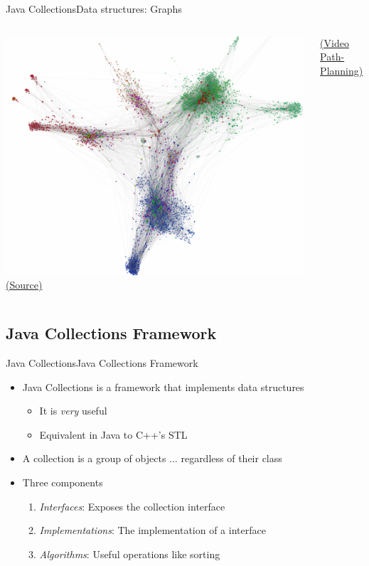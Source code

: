 \documentclass[10pt,compress]{beamer} %
\begin{document}
\begin{frame}{Java Collections}{Data structures: Graphs}
\begin{columns}
		\includegraphics[width=\linewidth]{figs/layout2.png}\\
		\centering \tiny \href{https://gephi.org/features/}{(Source)}


		\normalsize \href{https://www.youtube.com/watch?v=tH9dNESH4ic}{(Video Path-Planning)}

		\end{columns}
\end{frame}


\subsection{Java Collections Framework}
\begin{frame}{Java Collections}{Java Collections Framework}
	\begin{itemize}
		\item Java Collections is a framework that implements data structures
			\begin{itemize}
			\item It is \textit{very} useful
			\item Equivalent in Java to C++'s STL
			\end{itemize}
		\item A collection is a group of objects ... regardless of their class
		\item Three components
			\begin{enumerate}
			\item \textit{Interfaces}: Exposes the collection interface
			\item \textit{Implementations}: The implementation of a interface
			\item \textit{Algorithms}: Useful operations like sorting
			\end{enumerate}
	\end{itemize}
\end{frame}
\end{document}
